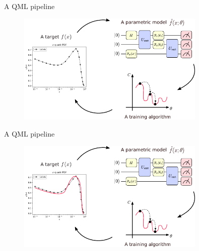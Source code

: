 \documentclass[aspectratio=169, 8pt, xcolor={svgnames}, hyperref={linkcolor=black}]{beamer}
\begin{document}
\begin{frame}{A QML pipeline}
\begin{figure}
   \includegraphics[width=0.8\textwidth]{figures/qml_simplified_1.pdf}
\end{figure}
\end{frame}

\begin{frame}{A QML pipeline}
\begin{figure}
   \includegraphics[width=0.8\textwidth]{figures/qml_simplified_2.pdf}
\end{figure}
\end{frame}
\end{document}
